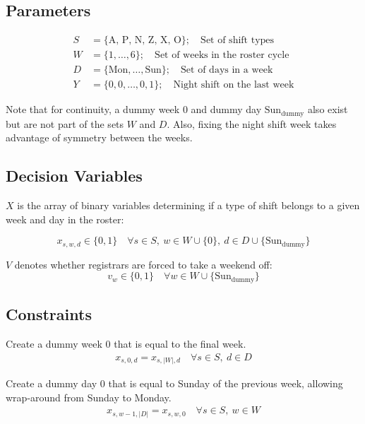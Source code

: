 \documentclass[a4paper]{article}
\begin{document}
\subsection{Parameters}
\begin{multicols}{2}
\noindent
\begin{align*}
S &= \{\text{A, P, N, Z, X, O}\}; \quad\text{Set of shift types}\\
W &= \{1, \dots, 6\}; \quad\text{Set of weeks in the roster cycle}\\
D &= \{\text{Mon},\dots,\text{Sun}\}; \quad\text{Set of days in a week}\\
Y  &= \{0, 0,\dots, 0, 1\}; \quad\text{Night shift on the last week}
\end{align*}

Note that for continuity, a dummy week $0$ and dummy day $\text{Sun}_\text{dummy}$ also exist but are not part of the sets $W$ and $D$. Also, fixing the night shift week takes advantage of symmetry between the weeks.
\end{multicols}
\subsection{Decision Variables}

$X$ is the array of binary variables determining if a type of shift belongs to a given week and day in the roster:

$$x_{s, w, d} \in \{0, 1\} \quad\forall s\in S,\  w\in W \cup \{0\},\ d\in D \cup \{\text{Sun}_\text{dummy}\}$$

$V$ denotes whether registrars are forced to take a weekend off:
$$v_w \in \{0, 1\} \quad\forall w\in W \cup \{\text{Sun}_\text{dummy}\}$$

\subsection{Constraints}

Create a dummy week 0 that is equal to the final week.
\begin{align}
  x_{s, 0, d} = x_{s, |W|, d} \quad\forall s\in S,\ d\in D
\end{align}

Create a dummy day 0 that is equal to Sunday of the previous week, allowing wrap-around from Sunday to Monday.
\begin{align}
  x_{s, w-1, |D|} = x_{s, w, 0} \quad\forall s\in S,\ w\in W
\end{align}
\end{document}
